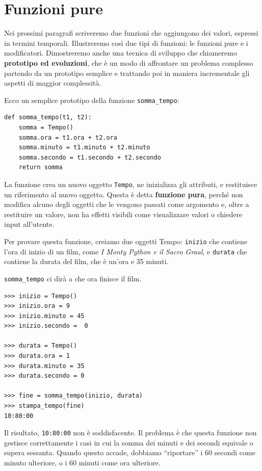 \documentclass[10pt]{book}
\begin{document}
\section{Funzioni pure}

Nei prossimi paragrafi scriveremo due funzioni che aggiungono dei valori, espressi in termini temporali. Illustreremo così due tipi di funzioni: le funzioni pure e i modificatori. Dimostreremo anche una tecnica di sviluppo che chiameremo {\bf prototipo ed evoluzioni}, che è un modo di affrontare un problema complesso partendo da un prototipo semplice e trattando poi in maniera incrementale gli aspetti di maggior complessità.

Ecco un semplice prototipo della funzione \verb"somma_tempo":

\begin{verbatim}
def somma_tempo(t1, t2):
    somma = Tempo()
    somma.ora = t1.ora + t2.ora
    somma.minuto = t1.minuto + t2.minuto
    somma.secondo = t1.secondo + t2.secondo
    return somma
\end{verbatim}
%
La funzione crea un nuovo oggetto {\tt Tempo}, ne inizializza gli attributi, e restituisce un riferimento al nuovo oggetto. Questa è detta {\bf funzione pura},  perché non modifica alcuno degli oggetti che le vengono passati come argomento e, oltre a restituire un valore, non ha effetti visibili come visualizzare valori o chiedere input all'utente.

Per provare questa funzione, creiamo due oggetti Tempo: {\tt inizio}
che contiene l'ora di inizio di un film, come {\em I Monty Python e il Sacro Graal}, e {\tt durata} che contiene la durata del film, che è un'ora e 35 minuti.

\verb"somma_tempo" ci dirà a che ora finisce il film.

\begin{verbatim}
>>> inizio = Tempo()
>>> inizio.ora = 9
>>> inizio.minuto = 45
>>> inizio.secondo =  0

>>> durata = Tempo()
>>> durata.ora = 1
>>> durata.minuto = 35
>>> durata.secondo = 0

>>> fine = somma_tempo(inizio, durata)
>>> stampa_tempo(fine)
10:80:00
\end{verbatim}
%
Il risultato, {\tt 10:80:00} non è soddisfacente. Il problema è che questa funzione non gestisce correttamente i casi in cui la somma dei minuti e dei secondi equivale o supera sessanta. Quando questo accade, dobbiamo ``riportare'' i 60 secondi come minuto ulteriore, o i 60 minuti come ora ulteriore.
\end{document}
